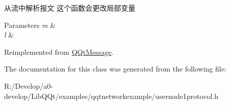 从流中解析报文 这个函数会更改局部变量 


\begin{DoxyParams}{Parameters}
{\em m} & \\
\hline
{\em l} & \\
\hline
\end{DoxyParams}


Reimplemented from \mbox{\hyperlink{class_q_qt_message_a0bc25669bdd61490b1d8df6d77565f31}{Q\+Qt\+Message}}.



The documentation for this class was generated from the following file\+:\begin{DoxyCompactItemize}
\item 
R\+:/\+Develop/a0-\/develop/\+Lib\+Q\+Qt/examples/qqtnetworkexample/usernode1protocol.\+h\end{DoxyCompactItemize}
